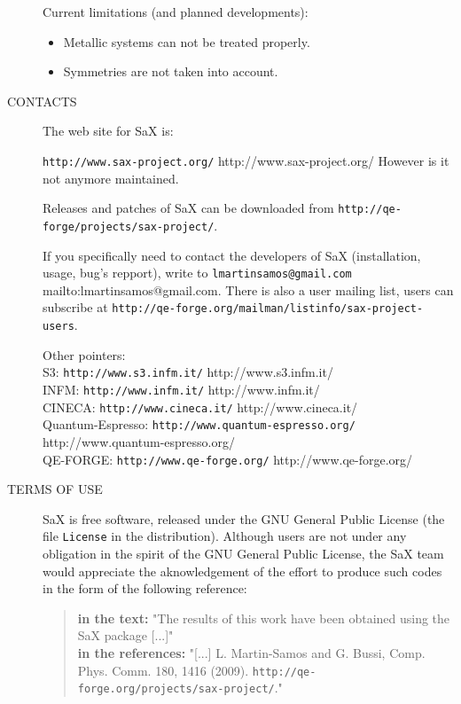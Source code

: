 \documentclass[11pt]{article}
\begin{document}
\begin{description}
Current limitations (and planned developments):
\begin{itemize}
\item Metallic systems can not be treated properly.
\item Symmetries are not taken into account.
\end{itemize}

\item[CONTACTS] The web site for SaX is:
\medskip

\texttt{http://www.sax-project.org/}
                  http://www.sax-project.org/
However is it not anymore maintained.

\medskip
\noindent
Releases and patches of SaX can be downloaded from
\texttt{http://qe-forge/projects/sax-project/}.

If you specifically need to contact the developers of SaX (installation, usage, bug's repport), write to
\texttt{lmartinsamos@gmail.com}
                  mailto:lmartinsamos@gmail.com. 
There is also a user mailing list, users can subscribe at \texttt{http://qe-forge.org/mailman/listinfo/sax-project-users}.

Other pointers:\\
S3:
\texttt{http://www.s3.infm.it/}
                  http://www.s3.infm.it/\\
INFM:
\texttt{http://www.infm.it/}%
                  http://www.infm.it/\\
CINECA:
\texttt{http://www.cineca.it/}
                  http://www.cineca.it/\\
Quantum-Espresso:
\texttt{http://www.quantum-espresso.org/}
                  http://www.quantum-espresso.org/\\
QE-FORGE:
\texttt{http://www.qe-forge.org/}
		  http://www.qe-forge.org/\\

\item[TERMS OF USE] SaX is free software, released under the GNU General Public
License (the file \texttt{License} in the distribution). Although users are not under any obligation in the spirit of the GNU General Public License, the SaX team would appreciate the aknowledgement of the effort to produce such codes in the form of the following reference:
\begin{quote}
{\bf in the text: } "The results of this work have been obtained using the SaX package [...]" \\
{\bf in the references: } "[...] L. Martin-Samos and G. Bussi, Comp. Phys. Comm. 180, 1416 (2009).
\texttt{http://qe-forge.org/projects/sax-project/}."
\end{quote}


\end{description}
\end{document}
